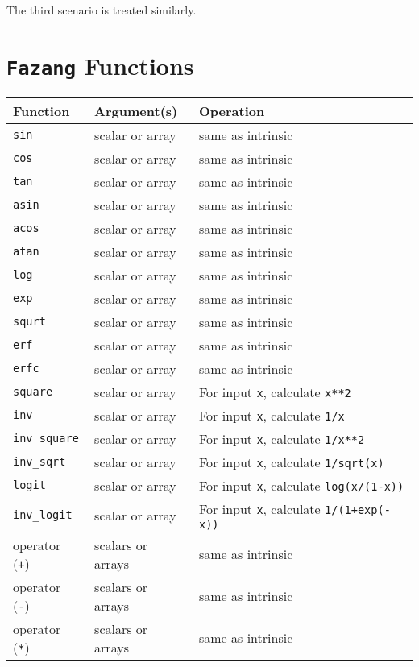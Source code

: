 \documentclass[12pt, reqno, oneside]{amsbook}
\begin{document}
The third scenario is treated similarly.

\appendix
\chapter{\texttt{Fazang} Functions \label{sec:func_list}}
\label{sec:org05b5a54}
\label{appendix:func}  
\begin{center}
\begin{tabular}{lll}
Function & Argument(s) & Operation\\
\hline
\texttt{sin} & scalar or array & same as intrinsic\\
\texttt{cos} & scalar or array & same as intrinsic\\
\texttt{tan} & scalar or array & same as intrinsic\\
\texttt{asin} & scalar or array & same as intrinsic\\
\texttt{acos} & scalar or array & same as intrinsic\\
\texttt{atan} & scalar or array & same as intrinsic\\
\texttt{log} & scalar or array & same as intrinsic\\
\texttt{exp} & scalar or array & same as intrinsic\\
\texttt{squrt} & scalar or array & same as intrinsic\\
\texttt{erf} & scalar or array & same as intrinsic\\
\texttt{erfc} & scalar or array & same as intrinsic\\
\texttt{square} & scalar or array & For input \texttt{x}, calculate \texttt{x**2}\\
\texttt{inv} & scalar or array & For input \texttt{x}, calculate \texttt{1/x}\\
\texttt{inv\_square} & scalar or array & For input \texttt{x}, calculate \texttt{1/x**2}\\
\texttt{inv\_sqrt} & scalar or array & For input \texttt{x}, calculate \texttt{1/sqrt(x)}\\
\texttt{logit} & scalar or array & For input \texttt{x}, calculate \texttt{log(x/(1-x))}\\
\texttt{inv\_logit} & scalar or array & For input \texttt{x}, calculate \texttt{1/(1+exp(-x))}\\
operator (\texttt{+}) & scalars or arrays & same as intrinsic\\
operator (\texttt{-}) & scalars or arrays & same as intrinsic\\
operator (\texttt{*}) & scalars or arrays & same as intrinsic\\

\end{tabular}
\end{center}
\end{document}
